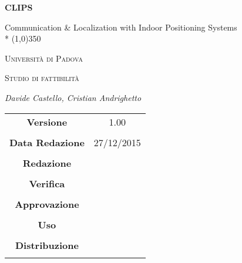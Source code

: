 \documentclass{article}
\begin{document}
\begin{titlepage}
	\centering
	{\huge\bfseries CLIPS\par}
	Communication \& Localization with Indoor Positioning Systems \\*
	\line(1,0){350} \\
	{\scshape\LARGE Università di Padova \par}
	\vspace{1cm}
	{\scshape\Large Studio di fattibilità\par}
	\vspace{1.5cm}
	
	\vspace{2cm}
	{\Large\itshape Davide Castello, Cristian Andrighetto\par}
	
	\vfill \vfill
	\begin{tabular}{c|c}
	{\hfill \textbf{Versione}} & 1.00\\ \\
	{\hfill\textbf{Data Redazione}} & 27/12/2015  \\ \\
	{\hfill\textbf{Redazione}} &  \\ \\
	{\hfill\textbf{Verifica}} &  \\ \\
	{\hfill\textbf{Approvazione}} &  \\ \\
	{\hfill\textbf{Uso}} & \\ \\
	{\hfill\textbf{Distribuzione}} & \\ \\
	\end{tabular}
\end{titlepage}
	
	\newpage

	\tableofcontents

	\newpage
		
	\newpage
		
	\newpage
		
	\newpage
		
\end{document}
